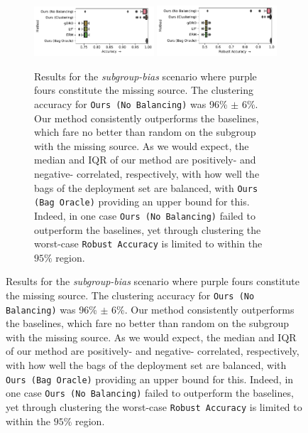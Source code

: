 \begin{figure}[t]
  \centering
  \begin{subfigure}[b]{\textwidth}
  \includegraphics[width=0.49\textwidth]{supmatch/figures/cmnist/subgroup_bias/cmnist_2v4_partial_acc.pdf}
  \includegraphics[width=0.49\textwidth]{supmatch/figures/cmnist/subgroup_bias/cmnist_2v4_partial_acc-min.pdf}
  \caption{
    Results for the \emph{subgroup-bias} scenario where {\color{purple}purple} fours constitute the missing source.
    The clustering accuracy for \texttt{Ours (No Balancing)} was 96\% $\pm$ 6\%.
    Our method consistently outperforms the baselines, which fare no better than random on the subgroup with the missing source. 
    As we would expect, the median and IQR of our method are positively- and negative- correlated, respectively, with how well the bags of the deployment set are balanced, with \texttt{Ours (Bag Oracle)} providing an upper bound for this.
    Indeed, in one case \texttt{Ours (No Balancing)} failed to outperform the baselines, yet through
    clustering the worst-case \texttt{Robust Accuracy} is limited to within the $95\%$ region.
  }%
  \label{fig:cmnist-2v4-partial}
  \end{subfigure}
  

\end{figure}
